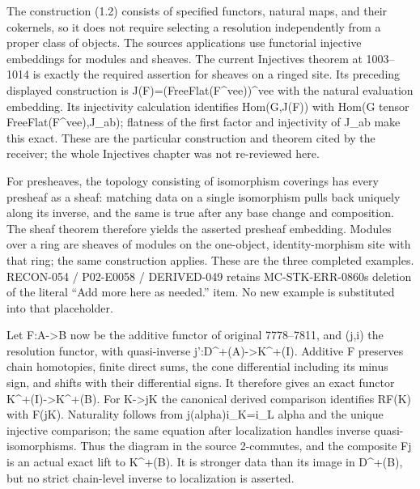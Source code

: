\documentclass[11pt]{article}
\begin{document}
The construction (1.2)\allowbreak{} consists of specified functors,\allowbreak{} natural maps,\allowbreak{} and their cokernels,\allowbreak{} so it does not require selecting a resolution independently from a proper class of objects. The source\textquotesingle s applications use functorial injective embeddings for modules and sheaves. The current Injectives theorem at 1003–\allowbreak{}1014 is exactly the required assertion for sheaves on a ringed site. Its preceding displayed construction is J(F)\allowbreak{}\allowbreak{}=(FreeFlat(F\textasciicircum{}vee)\allowbreak{})\allowbreak{}\textasciicircum{}vee with the natural evaluation embedding. Its injectivity calculation identifies Hom(G,\allowbreak{}J(F)\allowbreak{})\allowbreak{} with Hom(G tensor FreeFlat(F\textasciicircum{}vee)\allowbreak{},\allowbreak{}J\_\allowbreak{}ab)\allowbreak{}; flatness of the first factor and injectivity of J\_\allowbreak{}ab make this exact. These are the particular construction and theorem cited by the receiver; the whole Injectives chapter was not re-reviewed here.

For presheaves,\allowbreak{} the topology consisting of isomorphism coverings has every presheaf as a sheaf:\allowbreak{} matching data on a single isomorphism pulls back uniquely along its inverse,\allowbreak{} and the same is true after any base change and composition. The sheaf theorem therefore yields the asserted presheaf embedding. Modules over a ring are sheaves of modules on the one-object,\allowbreak{} identity-morphism site with that ring; the same construction applies. These are the three completed examples. RECON-054 /\allowbreak{} P02-E0058 /\allowbreak{} DERIVED-049 retains MC-STK-ERR-0860\textquotesingle s deletion of the literal ``Add more here as needed.'' item. No new example is substituted into that placeholder.

Let F:\allowbreak{}A\allowbreak{}->B now be the additive functor of original 7778–\allowbreak{}7811,\allowbreak{} and (j,\allowbreak{}i)\allowbreak{} the resolution functor,\allowbreak{} with quasi-inverse j':\allowbreak{}D\textasciicircum{}\allowbreak{}+(A)\allowbreak{}\allowbreak{}->K\textasciicircum{}\allowbreak{}+(I)\allowbreak{}. Additive F preserves chain homotopies,\allowbreak{} finite direct sums,\allowbreak{} the cone differential including its minus sign,\allowbreak{} and shifts with their differential signs. It therefore gives an exact functor K\textasciicircum{}\allowbreak{}+(I)\allowbreak{}\allowbreak{}->K\textasciicircum{}\allowbreak{}+(B)\allowbreak{}. For K\allowbreak{}->jK the canonical derived comparison identifies RF(K)\allowbreak{} with F(jK)\allowbreak{}. Naturality follows from j(alpha)\allowbreak{}i\_\allowbreak{}K\allowbreak{}=i\_\allowbreak{}L alpha and the unique injective comparison; the same equation after localization handles inverse quasi-isomorphisms. Thus the diagram in the source 2-commutes,\allowbreak{} and the composite Fj\textquotesingle{} is an actual exact lift to K\textasciicircum{}\allowbreak{}+(B)\allowbreak{}. It is stronger data than its image in D\textasciicircum{}\allowbreak{}+(B)\allowbreak{},\allowbreak{} but no strict chain-level inverse to localization is asserted.
\end{document}
